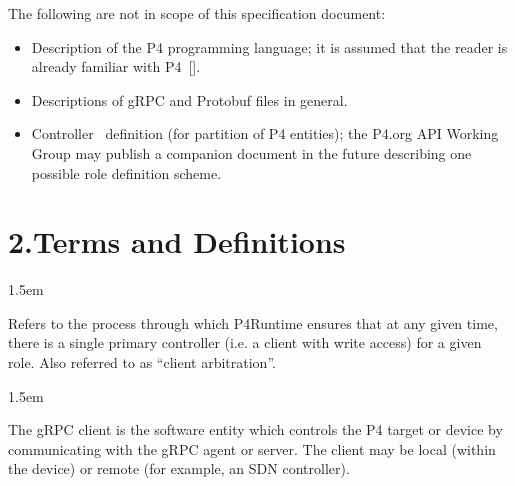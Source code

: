 \documentclass[11pt]{article}
\begin{document}
{%
\noindent{}The following are not in scope of this specification document:%

\begin{itemize}[noitemsep,topsep=\mdcompacttopsep]%

\item{}Description of the P4 programming language; it is assumed that the reader is
already familiar with P4~[].%

\item{}Descriptions of gRPC and Protobuf files in general.%

\item{}Controller~ definition (for partition of
P4 entities); the P4.org API Working Group may publish a companion document in
the future describing one possible role definition scheme.%
\end{itemize}%

\section{2.\hspace*{0.5em}Terms and Definitions}\label{sec-terms-and-definitions}%

\begin{mddefinitions}%


\begin{mdbmarginx}{}{}{}{1.5em}%
\begin{mddefdata}%
Refers to the process through which P4Runtime ensures that at any given
time, there is a single primary controller (i.e. a client with write access)
for a given role. Also referred to as \textquotedblleft{}client arbitration\textquotedblright{}.
\end{mddefdata}%
\end{mdbmarginx}%


\begin{mdbmarginx}{}{}{}{1.5em}%
\begin{mddefdata}%
The gRPC client is the software entity which controls the P4 target or
device by communicating with the gRPC agent or server. The client may be
local (within the device) or remote (for example, an SDN controller).
\end{mddefdata}%
\end{mdbmarginx}%


\end{mddefinitions}}
\end{document}
